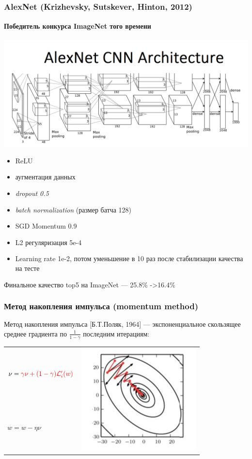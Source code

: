 \documentclass[fullscreen=true, bookmarks=true, hyperref={pdfencoding=unicode}]{beamer}
\begin{document}
\begin{frame}
  \frametitle{AlexNet (Krizhevsky, Sutskever, Hinton, 2012)}
  \framesubtitle{Победитель конкурса ImageNet того времени}
  \begin{center}
    \includegraphics[keepaspectratio,
                     width=0.5\paperwidth]{AlexNetCNN.png}
  \end{center}
  \begin{itemize}
    \item ReLU
    \item аугментация данных
    \item {\it dropout 0.5}
    \item {\it batch normalization} (размер батча 128)
    \item SGD Momentum 0.9
    \item L2 регуляризация 5e-4
    \item Learning rate 1e-2, потом уменьшение в 10 раз после стабилизации качества на тесте
  \end{itemize}

    Финальное качество top5 на ImageNet — 25.8\% ->16.4\%
\end{frame}


\begin{frame}
  \frametitle{Метод накопления импульса (momentum method)}
  Метод накопления импульса [Б.Т.Поляк, 1964] — экспоненциальное скользящее среднее градиента по $\frac{1}{1-\gamma}$ последним итерациям:

  \begin{tabular}{lr}
    $\nu = \color{red}{\gamma} \nu + \color{red}{(1-\gamma)} \mathcal{L}_i^\prime(w)$ &
    \multirow{2}{*}{\includegraphics[keepaspectratio,
                     width=0.3\paperwidth]{momentum_2.jpg}} \\
      $w = w - \eta \nu$ &
  \end{tabular}

\end{frame}
\end{document}
